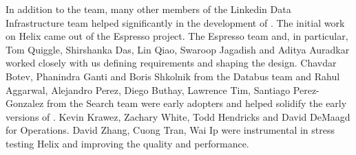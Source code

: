 In addition to the \helix team, many other members of the Linkedin Data Infrastructure team 
helped significantly in the development of \helix. 
The initial work on Helix came out of the Espresso project. The Espresso team
and, in particular, Tom Quiggle, Shirshanka Das, Lin Qiao, Swaroop Jagadish and
Aditya Auradkar worked closely with us defining requirements and shaping the design. 
Chavdar Botev, Phanindra Ganti and Boris Shkolnik from the Databus team and Rahul Aggarwal, Alejandro Perez, 
Diego Buthay, Lawrence Tim, Santiago Perez-Gonzalez from the Search team were 
early adopters and helped solidify the early versions of \helix. Kevin Krawez,
Zachary White, Todd Hendricks and David DeMaagd for Operations.
David Zhang, Cuong Tran, Wai Ip were instrumental in stress
testing Helix and improving the quality and performance. 


